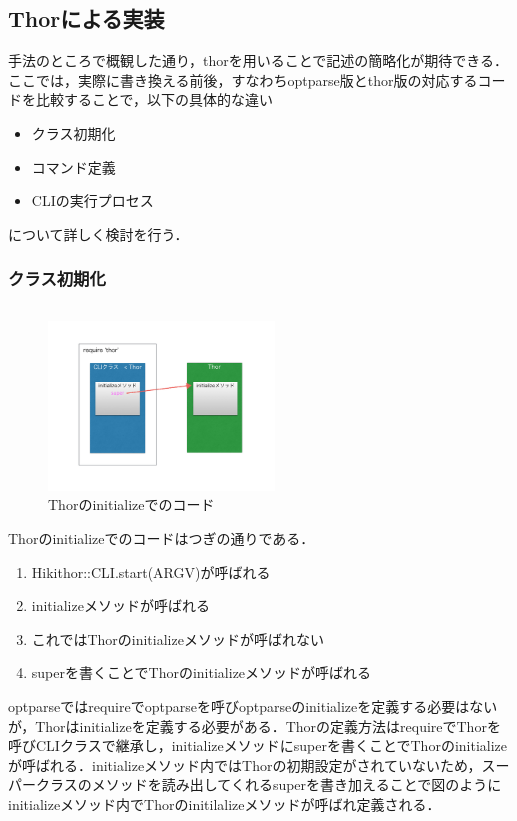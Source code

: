 \subsection{Thorによる実装}
手法のところで概観した通り，thorを用いることで記述の簡略化が期待できる．ここでは，実際に書き換える前後，すなわちoptparse版とthor版の対応するコードを比較することで，以下の具体的な違い
\begin{itemize}
\item クラス初期化
\item コマンド定義
\item CLIの実行プロセス
\end{itemize}
について詳しく検討を行う．

\subsubsection{クラス初期化}\begin{quote}\begin{verbatim}

\end{verbatim}\end{quote}
\begin{figure}[htbp]\begin{center}
\includegraphics[width=6cm,bb=0 0 442 432]{../figs/./hikiutils_yamane_09_copy.003.jpg}
\caption{Thorのinitializeでのコード}
\label{default}\end{center}\end{figure}
Thorのinitializeでのコードはつぎの通りである．
\begin{enumerate}
\item Hikithor::CLI.start(ARGV)が呼ばれる
\item initializeメソッドが呼ばれる
\item これではThorのinitializeメソッドが呼ばれない
\item superを書くことでThorのinitializeメソッドが呼ばれる
\end{enumerate}
optparseではrequireでoptparseを呼びoptparseのinitializeを定義する必要はないが，Thorはinitializeを定義する必要がある．Thorの定義方法はrequireでThorを呼びCLIクラスで継承し，initializeメソッドにsuperを書くことでThorのinitializeが呼ばれる．initializeメソッド内ではThorの初期設定がされていないため，スーパークラスのメソッドを読み出してくれるsuperを書き加えることで図のようにinitializeメソッド内でThorのinitilalizeメソッドが呼ばれ定義される．
